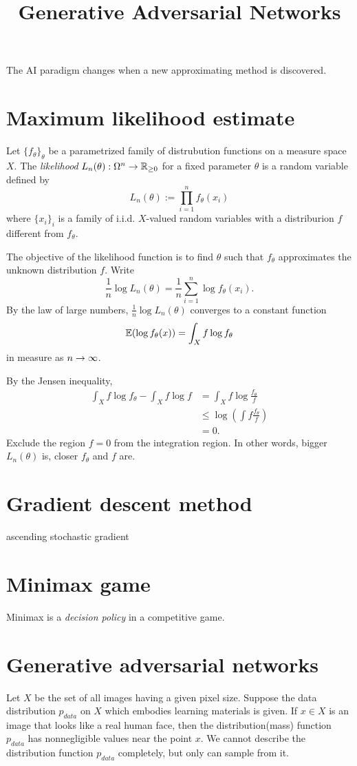 \documentclass{../exp}
\title{Generative Adversarial Networks}
\begin{document}
\maketitle

The AI paradigm changes when a new approximating method is discovered.

\section{Maximum likelihood estimate}
\begin{defn}
Let $\{f_\theta\}_\theta$ be a parametrized family of distrubution functions on a measure space $X$.
The \emph{likelihood} $L_n(\theta):\Omega^n\to\R_{\ge0}$ for a fixed parameter $\theta$ is a random variable defined by
\[L_n(\theta):=\prod_{i=1}^nf_\theta(x_i)\]
where $\{x_i\}_i$ is a family of i.i.d. $X$-valued random variables with a distriburion $f$ different from $f_\theta$.
\end{defn}
The objective of the likelihood function is to find $\theta$ such that $f_\theta$ approximates the unknown distribution $f$.
Write
\[\frac1n\log L_n(\theta)=\frac1n\sum_{i=1}^n\log f_\theta(x_i).\]
By the law of large numbers, $\frac1n\log L_n(\theta)$ converges to a constant function
\[\mathbb{E}(\log f_\theta(x))=\int_Xf\log f_\theta\]
in measure as $n\to\oo$.

By the Jensen inequality, 
\begin{align*}
\int_Xf\log f_\theta-\int_Xf\log f&
=\int_Xf\log\frac{f_\theta}f\\
&\le\log\left(\int f\frac{f_\theta}f\right)\\
&=0.
\end{align*}
Exclude the region $f=0$ from the integration region.
In other words, bigger $L_n(\theta)$ is, closer $f_\theta$ and $f$ are.


\section{Gradient descent method}
ascending stochastic gradient


\section{Minimax game}

Minimax is a \emph{decision policy} in a competitive game.

\section{Generative adversarial networks}
Let $X$ be the set of all images having a given pixel size.
Suppose the data distribution $p_{data}$ on $X$ which embodies learning materials is given.
If $x\in X$ is an image that looks like a real human face, then the distribution(mass) function $p_{data}$ has nonnegligible values near the point $x$.
We cannot describe the distribution function $p_{data}$ completely, but only can sample from it.
\end{document}
